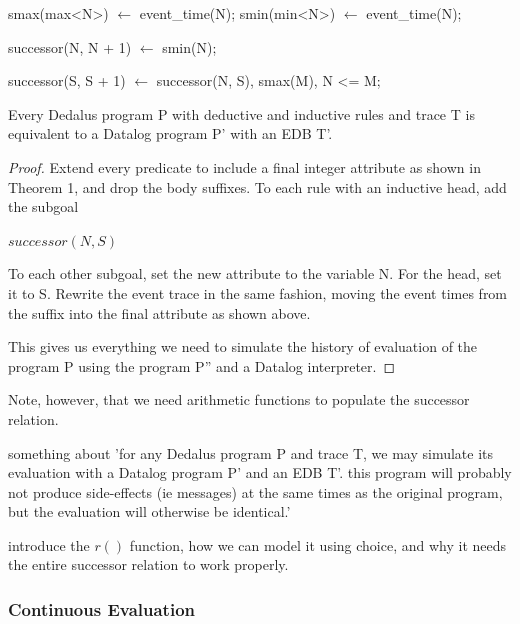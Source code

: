 \begin{Dedalus}
smax(max<N>) \(\leftarrow\) event\_time(N);
smin(min<N>) \(\leftarrow\) event\_time(N);

successor(N, N + 1) \(\leftarrow\) smin(N);

successor(S, S + 1) \(\leftarrow\) 
    successor(N, S),
    smax(M),
    N <= M;
\end{Dedalus}


\begin{theorem}
Every Dedalus program P with deductive and inductive rules and trace T is equivalent to a Datalog program P' with an EDB T'.
\end{theorem}

\begin{proof}

Extend every predicate to include a final integer attribute as shown in Theorem 1, and drop the body suffixes.  To each rule with an 
inductive head, add the subgoal 

$successor(N, S)$

To each other subgoal, set the new attribute to the variable N.  For the head, set it to S.  Rewrite the event trace in the same fashion, 
moving the event times from the suffix into the final attribute as shown above.


This gives us everything we need to simulate the history of evaluation of the program P using the program P'' and a Datalog interpreter.

\end{proof}

Note, however, that we need arithmetic functions to populate the successor relation.

\begin{theorem}
something about 'for any Dedalus program P and trace T, we may simulate its evaluation with a Datalog program P' and an EDB T'.  this program
will probably not produce side-effects (ie messages) at the same times as the original program, but the evaluation will otherwise be identical.'
\end{theorem}

introduce the $r()$ function, how we can model it using choice, and why it needs the entire successor relation to work properly.



\subsubsection{Continuous Evaluation}

